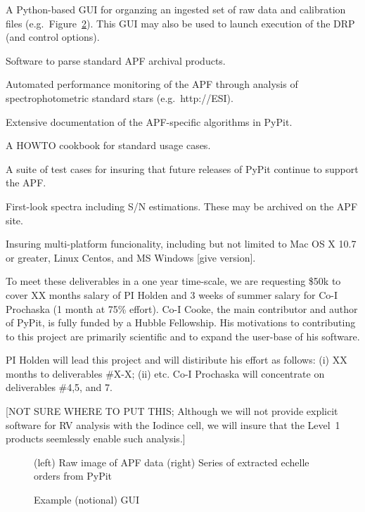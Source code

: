 \documentclass[11pt,preprint]{aastex}
\newenvironment{my_enumerate}{
\begin{enumerate}
  \setlength{\itemsep}{1pt}
  \setlength{\parskip}{0pt}
  \setlength{\parsep}{0pt}}{\end{enumerate}
}
\begin{document}
{\small 
\begin{my_enumerate}
\item A Python-based GUI for organzing an ingested set of raw data
and calibration files (e.g.\ Figure~\ref{fig:GUI}).  
This GUI may also be used to launch execution
of the DRP (and control options).
\item Software to parse standard APF archival products.
\item Automated performance monitoring of the APF through analysis of 
spectrophotometric standard stars (e.g.\ http://ESI).
\item Extensive documentation of the APF-specific algorithms in PyPit.
\item A HOWTO cookbook for standard usage cases.
\item A suite of test cases for insuring that future releases of
PyPit continue to support the APF.
\item First-look spectra including S/N estimations.  
These may be archived on the APF site.
\item Insuring multi-platform funcionality, including but not limited
to Mac OS X 10.7 or greater, Linux Centos, and MS Windows [give version].
\end{my_enumerate}
}
To meet these deliverables in a one year time-scale, we are requesting
\$50k to cover XX months salary of PI Holden and 3 weeks of summer
salary for Co-I Prochaska (1 month at 75\% effort).
Co-I Cooke, the main contributor and author of PyPit, is fully funded
by a Hubble Fellowship.  His motivations to contributing to this project
are primarily scientific and to expand the user-base of his software.

PI Holden will lead this project and will distiribute his effort as 
follows: (i) XX months to deliverables \#X-X; (ii) etc.
Co-I Prochaska will concentrate on deliverables
\#4,5, and 7.

[NOT SURE WHERE TO PUT THIS;
Although we will not provide explicit software for RV analysis
with the Iodince cell, we will insure that the Level~1 products
seemlessly enable such analysis.]




\clearpage

\begin{figure}
 \vskip -0.5in
\begin{center}
\end{center}
 \caption{\footnotesize  
(left) Raw image of APF data
(right) Series of extracted echelle orders from PyPit
}\label{fig:redux}
\end{figure}

\begin{figure}
 \vskip -0.5in
\begin{center}
\end{center}
 \caption{\footnotesize  
Example (notional) GUI
}\label{fig:GUI}
\end{figure}
\end{document}
